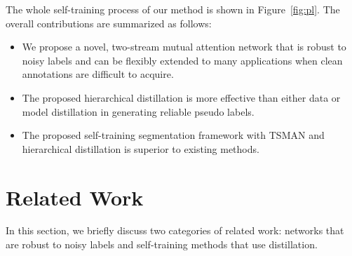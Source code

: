 \documentclass[letterpaper]{article} %
\begin{document}
The whole self-training process of our method is shown in Figure~\ref{fig:pl}.
The overall contributions are summarized as follows:
\begin{itemize}
\item We propose a novel, two-stream mutual attention network that is robust to noisy labels and can be flexibly extended to many applications when clean annotations are difficult to acquire.

\item The proposed hierarchical distillation is more effective than either data or model distillation in generating reliable pseudo labels.

\item The proposed self-training segmentation framework with TSMAN and hierarchical distillation is superior to existing methods.

\end{itemize}
\section{Related Work}\label{sec:related}

In this section, we briefly discuss two categories of related work: networks that are robust to noisy labels and self-training methods that use distillation.
\end{document}
